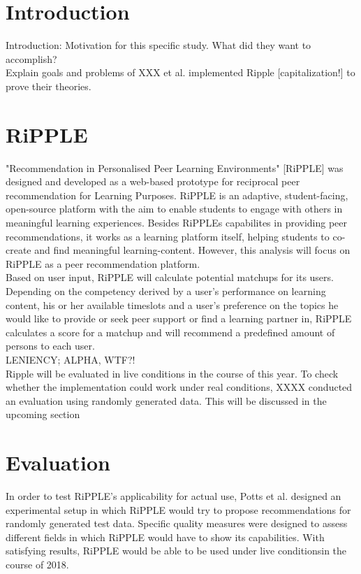 \documentclass[nochapterpage,bigchapter,linedtoc,longdoc,colorback,accentcolor=tud3b]{tudreport}
\begin{document}
\section{Introduction}
Introduction: Motivation for this specific study. What did they want to accomplish?\\
Explain goals and problems of 
XXX et al. implemented Ripple [capitalization!] to prove their theories. 
\section{RiPPLE}
"Recommendation in Personalised Peer Learning Environments" [RiPPLE] was designed and developed as a web-based prototype for reciprocal peer recommendation for Learning Purposes. RiPPLE is an adaptive, student-facing, open-source platform with the aim to enable students to engage with others in meaningful learning experiences. Besides RiPPLEs capabilites in providing peer recommendations, it works as a learning platform itself, helping students to co-create and find meaningful learning-content. However, this analysis will focus on RiPPLE as a peer recommendation platform.\\
Based on user input, RiPPLE will calculate potential matchups for its users. Depending on the competency derived by a user's performance on learning content, his or her available timeslots and a user's preference on the topics he would like to provide or seek peer support or find a learning partner in, RiPPLE calculates a score for a matchup and will recommend a predefined amount of persons to each user.\\
LENIENCY; ALPHA, WTF?!\\
Ripple will be evaluated in live conditions in the course of this year. To check whether the implementation could work under real conditions, XXXX conducted an evaluation using randomly generated data. This will be discussed in the upcoming section\\

\section{Evaluation}
In order to test RiPPLE's applicability for actual use, Potts et al. designed an experimental setup in which RiPPLE would try to propose recommendations for randomly generated test data. Specific quality measures were designed to assess different fields in which RiPPLE would have to show its capabilities. With satisfying results, RiPPLE would be able to be used under live conditionsin the course of 2018.\\
\end{document}
